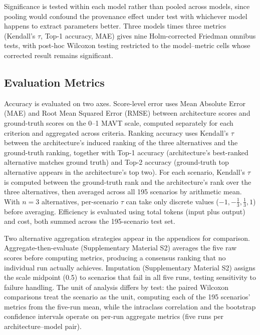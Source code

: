 \documentclass[a4paper,fleqn]{cas-dc}
\begin{document}
Significance is tested within each model rather than pooled across models, since pooling would confound the provenance effect under test with whichever model happens to extract parameters better. Three models times three metrics (Kendall's $\tau$, Top-1 accuracy, MAE) gives nine Holm-corrected Friedman omnibus tests, with post-hoc Wilcoxon testing restricted to the model--metric cells whose corrected result remains significant.

\subsection{Evaluation Metrics}
\label{sec:eval-metrics}
Accuracy is evaluated on two axes. Score-level error uses Mean Absolute Error (MAE) and Root Mean Squared Error (RMSE) between architecture scores and ground-truth scores on the 0--1 MAVT scale, computed separately for each criterion and aggregated across criteria. Ranking accuracy uses Kendall's $\tau$ between the architecture's induced ranking of the three alternatives and the ground-truth ranking, together with Top-1 accuracy (architecture's best-ranked alternative matches ground truth) and Top-2 accuracy (ground-truth top alternative appears in the architecture's top two). For each scenario, Kendall's $\tau$ is computed between the ground-truth rank and the architecture's rank over the three alternatives, then averaged across all 195 scenarios by arithmetic mean. With $n=3$ alternatives, per-scenario $\tau$ can take only discrete values ($-1, -\frac{1}{3}, \frac{1}{3}, 1$) before averaging. Efficiency is evaluated using total tokens (input plus output) and cost, both summed across the 195-scenario test set.

Two alternative aggregation strategies appear in the appendices for comparison. Aggregate-then-evaluate (Supplementary Material S2) averages the five raw scores before computing metrics, producing a consensus ranking that no individual run actually achieves. Imputation (Supplementary Material S2) assigns the scale midpoint (0.5) to scenarios that fail in all five runs, testing sensitivity to failure handling. The unit of analysis differs by test: the paired Wilcoxon comparisons treat the scenario as the unit, computing each of the 195 scenarios' metrics from the five-run mean, while the intraclass correlation and the bootstrap confidence intervals operate on per-run aggregate metrics (five runs per architecture--model pair).
\end{document}

